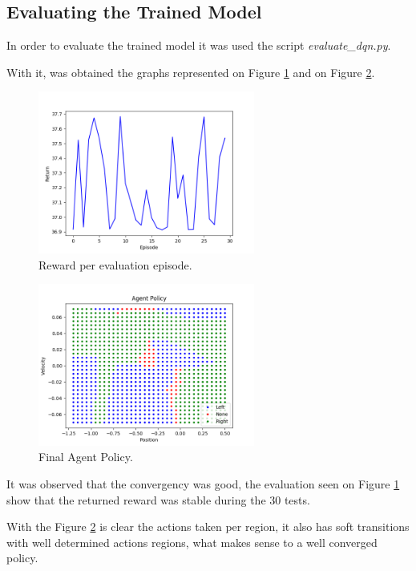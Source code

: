 \documentclass[journal]{IEEEtran}
\begin{document}
\subsection{Evaluating the Trained Model}

In order to evaluate the trained model it was used the script \textit{evaluate\_dqn.py}.

With it, was obtained the graphs represented on Figure \ref{fig:evaluate} and on Figure \ref{fig:policy}.

\begin{figure}
  \begin{center}
  \includegraphics[width=2.8in]{./../code/output/dqn_evaluation.png}
  \caption{Reward per evaluation episode.}
  \label{fig:evaluate}
  \end{center}
\end{figure}

\begin{figure}
  \begin{center}
  \includegraphics[width=2.8in]{./../code/output/agent_decision.png}
  \caption{Final Agent Policy.}
  \label{fig:policy}
  \end{center}
\end{figure}

It was observed that the convergency was good, the evaluation seen on Figure \ref{fig:evaluate} show that the returned reward was stable during the 30 tests.

With the Figure \ref{fig:policy} is clear the actions taken per region, it also has soft transitions with well determined actions regions, what makes sense to a well converged policy.
\end{document}
